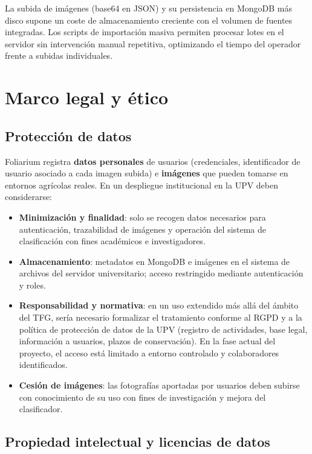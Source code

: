 \documentclass[11pt,spanish,listoffigures,listoftables]{tfgetsinf}
\begin{document}
La subida de imágenes (base64 en JSON) y su persistencia en MongoDB más disco supone un coste de almacenamiento creciente con el volumen de fuentes integradas. Los scripts de importación masiva permiten procesar lotes en el servidor sin intervención manual repetitiva, optimizando el tiempo del operador frente a subidas individuales.

\section{Marco legal y ético}

\subsection{Protección de datos}

Foliarium registra \textbf{datos personales} de usuarios (credenciales, identificador de usuario asociado a cada imagen subida) e \textbf{imágenes} que pueden tomarse en entornos agrícolas reales. En un despliegue institucional en la UPV deben considerarse:

\begin{itemize}
    \item \textbf{Minimización y finalidad}: solo se recogen datos necesarios para autenticación, trazabilidad de imágenes y operación del sistema de clasificación con fines académicos e investigadores.
    \item \textbf{Almacenamiento}: metadatos en MongoDB e imágenes en el sistema de archivos del servidor universitario; acceso restringido mediante autenticación y roles.
    \item \textbf{Responsabilidad y normativa}: en un uso extendido más allá del ámbito del TFG, sería necesario formalizar el tratamiento conforme al RGPD y a la política de protección de datos de la UPV (registro de actividades, base legal, información a usuarios, plazos de conservación). En la fase actual del proyecto, el acceso está limitado a entorno controlado y colaboradores identificados.
    \item \textbf{Cesión de imágenes}: las fotografías aportadas por usuarios deben subirse con conocimiento de su uso con fines de investigación y mejora del clasificador.
\end{itemize}

\subsection{Propiedad intelectual y licencias de datos}
\end{document}

